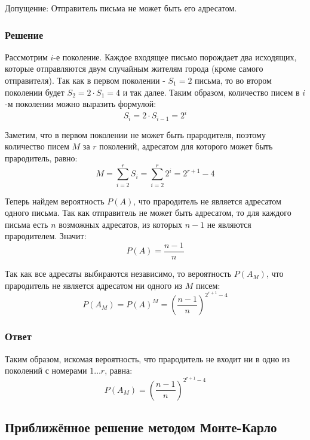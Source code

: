 \documentclass[a4paper,14pt]{extarticle}
\begin{document}
                Допущение: Отправитель письма не может быть его адресатом.
            
            \subsubsection*{Решение}
                
                Рассмотрим \( i \)-е поколение.
                Каждое входящее письмо порождает два исходящих, которые отправляются двум случайным жителям города (кроме самого отправителя). Так как в первом поколении - \( S_1 = 2 \) письма, то во втором поколении будет \( S_2 = 2 \cdot S_1 = 4 \) и так далее. Таким образом, количество писем в \( i \)-м поколении можно выразить формулой:
                \[
                    S_i = 2 \cdot S_{i-1} = 2^i
                \]
                
                Заметим, что в первом поколении не может быть прародителя, поэтому количество писем \( M \) за \( r \) поколений, адресатом для которого может быть прародитель, равно:
                \[
                    M = \sum_{i=2}^{r} S_i = \sum_{i=2}^{r} 2^i = 2^{r+1} - 4
                \]
                
                Теперь найдем вероятность \( P(A) \), что прародитель не является адресатом одного письма. Так как отправитель не может быть адресатом, то для каждого письма есть \( n \) возможных адресатов, из которых \( n - 1 \) не являются прародителем. Значит:
                \[
                    P(A) = \frac{n - 1}{n}
                \]
                
                Так как все адресаты выбираются независимо, то вероятность \( P (A_M) \), что прародитель не является адресатом ни одного из \( M \) писем:
                \[
                    P(A_M) = P(A)^M = \left(\frac{n - 1}{n}\right)^{2^{r+1} - 4}
                \]
            
            \subsubsection*{Ответ}
                
                Таким образом, искомая вероятность, что прародитель не входит ни в одно из поколений с номерами \( 1 \ldots r \), равна:
                \[
                    \boxed{P(A_M) = \left(\frac{n - 1}{n}\right)^{2^{r+1} - 4}}
                \]
        
        \subsection*{Приближённое решение методом Монте-Карло}
            
\end{document}
